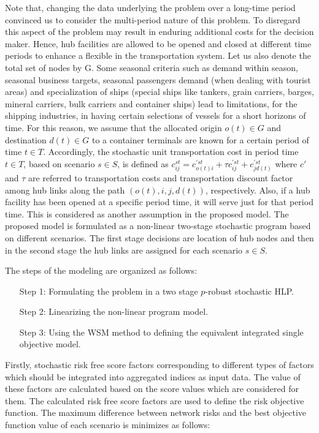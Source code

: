 \documentclass[review]{elsarticle}
\begin{document}
Note that, changing the data underlying the problem over a long-time period convinced us to consider the multi-period nature of this problem. To disregard this aspect of the problem may result in enduring additional costs for the decision maker. Hence, hub facilities are allowed to be opened and closed at different time periods to enhance a flexible in the transportation system. Let us also denote the total set of nodes by G. Some seasonal criteria such as demand within season, seasonal business targets, seasonal passengers demand (when dealing with tourist areas) and specialization of ships (special ships like tankers, grain carriers, barges, mineral carriers, bulk carriers and container ships) lead to limitations, for the shipping industries, in having certain selections of vessels for a short horizons of time. For this reason, we assume that the allocated origin $o(t)\in G$ and destination $d(t)\in G$ to a container terminals are known for a certain period of time $t\in T$. Accordingly, the stochastic unit transportation cost in period time $t\in T$, based on scenario $s\in S$, is defined as $c_{ij}^{st} =c_{o(t)i}^{'st} +\tau c_{ij}^{'st} +c_{jd(t)}^{'st} $ where $c'$ and $\tau $ are referred to transportation costs and transportation discount factor among hub links along the path  $\left(o(t), i, j, d(t)\right)$, respectively. Also, if a hub facility has been opened at a specific period time, it will serve just for that period time. This is considered as another assumption in the proposed model. The proposed model is formulated as a non-linear two-stage stochastic program based on different scenarios. The first stage decisions are location of hub nodes and then in the second stage the hub links are assigned for each scenario $s\in S$.

The steps of the modeling are organized as follows: 
\begin{itemize}
\item[Step 1:]
Formulating the problem in a two stage $p$-robust stochastic HLP.
\item[Step 2:]
Linearizing the non-linear program model.
\item[Step 3:]
Using the WSM method to defining the equivalent integrated single objective model.
\end{itemize}
Firstly, stochastic risk free score factors corresponding to different types of factors which should be integrated into aggregated indices as input data. The value of these factors are calculated based on the score values which are considered for them. The calculated risk free score factors are used to define the risk objective function. The maximum difference between network risks and the best objective function value of each scenario is minimizes as follows:
\end{document}
